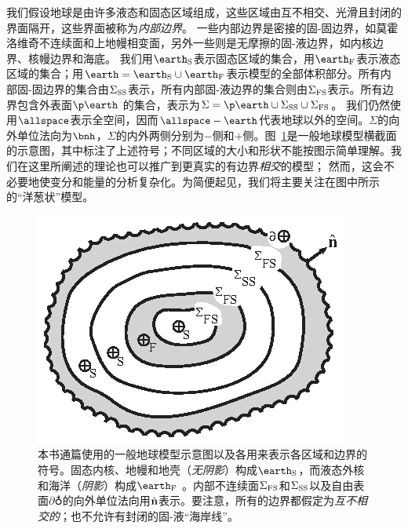 我们假设地球是由许多液态和固态区域组成，这些区域由互不相交、光滑且封闭的界面隔开，这些界面被称为{\em 内部边界\/}。
%
%
%
一些内部边界是密接的固-固边界，如莫霍洛维奇不连续面和上地幔相变面，另外一些则是无摩擦的固-液边界，如内核边界、核幔边界和海底。
%
%
%
我们用$\earth_{\rm S}$表示固态区域的集合，用$\earth_{\rm F}$表示液态区域的集合；用$\earth=\earth_{\rm S}\cup\earth_{\rm F}$表示模型的全部体积部分。所有内部固-固边界的集合由$\Sigma_{\rm SS}$表示，所有内部固-液边界的集合则由$\Sigma_{\rm FS}$表示。所有边界包含外表面$\p\earth$ 的集合，表示为$\Sigma=\p\earth\cup\Sigma_{\rm SS}\cup\Sigma_{\rm FS}$。
%
%
我们仍然使用$\allspace$表示全空间，因而$\allspace -\earth$代表地球以外的空间。$\Sigma$的向外单位法向为$\bnh$，$\Sigma$的内外两侧分别为$-$侧和$+$侧。图~\ref{fig3.1}是一般地球模型横截面的示意图，其中标注了上述符号；不同区域的大小和形状不能按图示简单理解。我们在这里所阐述的理论也可以推广到更真实的有边界{\em 相交\/}的模型；
%
%
然而，这会不必要地使变分和能量的分析复杂化。为简便起见，我们将主要关注在图中所示的“洋葱状”模型。
\begin{figure}[t]
\begin{center}
\includegraphics{../figures/chap03/fig01.eps}
\end{center}
\caption[Earth]{\label{fig3.1}
本书通篇使用的一般地球模型示意图以及各用来表示各区域和边界的符号。固态内核、地幔和地壳（{\em 无阴影\/}）构成$\earth_{\rm S}$，而液态外核和海洋（{\em 阴影\/}）构成$\earth_{\rm F}$ 。内部不连续面$\Sigma_{\rm FS}$和$\Sigma_{\rm SS}$以及自由表面$\partial\earth$的向外单位法向用$\hat{\bf n}$表示。要注意，所有的边界都假定为{\em 互不相交的\/}；也不允许有封闭的固-液“海岸线”。}
\end{figure}

